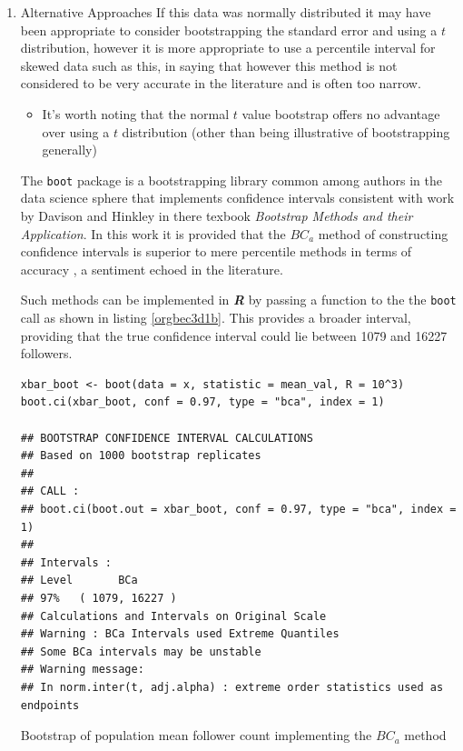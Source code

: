 \documentclass[11pt]{article}
\begin{document}
\begin{enumerate}
\item Alternative Approaches
\label{sec:orgbec35f5}
If this data was normally distributed it may have been appropriate to consider
bootstrapping the standard error and using a \(t\) distribution, however it is more appropriate to use a
percentile interval for skewed data such as this, in saying that however this method is not considered to be very accurate in the literature and is often too narrow. \cite[Section 4.1]{hesterberg2015}

\begin{itemize}
\item It's worth noting that the normal \(t\) value bootstrap offers no advantage over
using a \(t\) distribution (other than being illustrative of bootstrapping
generally) \cite[Section 4.1]{hesterberg2015}
\end{itemize}


 The \texttt{boot} package is a bootstrapping library common among authors in the data science sphere
 \cite[p. 295]{james2013} \cite[p. 237]{wiley2019} that implements
 confidence intervals consistent with work by Davison and Hinkley
 \cite{ripley2020} in there texbook \emph{Bootstrap Methods and their Application}.
In this work it is provided that the \(BC_{a}\) method of constructing confidence
 intervals is  superior to mere percentile
 methods in terms of accuracy \cite[Ch. 5]{davison1997}, a sentiment echoed in the literature. \cite[Ch. 5]{carpenter2000,davison1997}

Such methods can be implemented in \textbf{\emph{R}} by passing a function to the the \texttt{boot} call as shown in listing \ref{orgbec3d1b}. This provides a broader interval, providing that the true confidence interval could lie between 1079 and 16227 followers.

\begin{listing}[htbp]
\begin{verbatim}
xbar_boot <- boot(data = x, statistic = mean_val, R = 10^3)
boot.ci(xbar_boot, conf = 0.97, type = "bca", index = 1)

## BOOTSTRAP CONFIDENCE INTERVAL CALCULATIONS
## Based on 1000 bootstrap replicates
##
## CALL :
## boot.ci(boot.out = xbar_boot, conf = 0.97, type = "bca", index = 1)
##
## Intervals :
## Level       BCa
## 97%   ( 1079, 16227 )
## Calculations and Intervals on Original Scale
## Warning : BCa Intervals used Extreme Quantiles
## Some BCa intervals may be unstable
## Warning message:
## In norm.inter(t, adj.alpha) : extreme order statistics used as endpoints
\end{verbatim}
\caption{\label{orgbec3d1b}Bootstrap of population mean follower count implementing the \(BC_{a}\) method}
\end{listing}
\end{enumerate}
\end{document}

